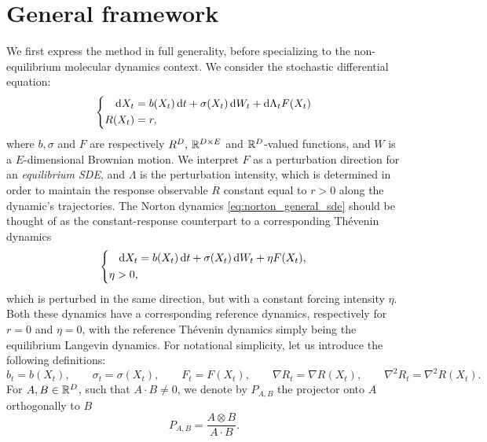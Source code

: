 \section{General framework}
We first express the method in full generality, before specializing to the non-equilibrium molecular dynamics context. We consider the stochastic differential equation:
\begin{equation}
    \label{eq:norton_general_sde}
    \left\{\begin{aligned}
        \mathrm{d} X_t &= b(X_t)\,\mathrm{d} t +\sigma(X_t)\,\mathrm{d} W_t + \mathrm{d} \Lambda_t F(X_t)\\
        R(X_t)&= r,
    \end{aligned}\right.
\end{equation}
where $b ,\sigma$ and $F$ are respectively $R^D,\, \mathbb{R}^{D\times E}$ and $\mathbb{R}^D$-valued functions, and $W$ is a $E$-dimensional Brownian motion.
We interpret $F$ as a perturbation direction for an \textit{equilibrium SDE}, and $\Lambda$ is the perturbation intensity, which is determined in order to maintain the response observable $R$ constant equal to $r>0$ along the dynamic's trajectories.
The Norton dynamics \eqref{eq:norton_general_sde} should be thought of as the constant-response counterpart to a corresponding Thévenin dynamics
\begin{equation}
        \label{eq:thevenin_general_sde}
    \left\{\begin{aligned}
        \mathrm{d} X_t &= b(X_t)\,\mathrm{d} t +\sigma(X_t)\,\mathrm{d} W_t + \eta F(X_t),\\
        \eta>0,
    \end{aligned}\right.
\end{equation}
which is perturbed in the same direction, but with a constant forcing intensity $\eta$. Both these dynamics have a corresponding reference dynamics, respectively for $r=0$ and $\eta=0$,
with the reference Thévenin dynamics simply being the equilibrium Langevin dynamics.
For notational simplicity, let us introduce the following definitions:
\begin{equation}
    \label{eq:norton_notation}
    b_t = b(X_t),\qquad \sigma_t = \sigma(X_t),\qquad F_t= F(X_t),\qquad \nabla R_t=\nabla R(X_t),\qquad \nabla^2 R_t = \nabla^2 R(X_t).
\end{equation}
For $A,B\in\mathbb{R}^{D}$, such that $A\cdot B\neq 0$, we denote by $P_{A,B}$ the projector onto $A$ orthogonally to $B$
\begin{equation}
    \label{eq:non_orthogonal_projector}
    P_{A,B}=\frac{A\otimes B}{A\cdot B}.
\end{equation}
